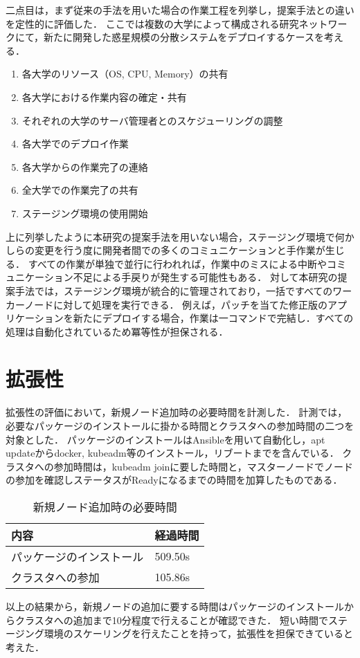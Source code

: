二点目は，まず従来の手法を用いた場合の作業工程を列挙し，提案手法との違いを定性的に評価した．
ここでは複数の大学によって構成される研究ネットワークにて，新たに開発した惑星規模の分散システムをデプロイするケースを考える．

\begin{enumerate}
  \item 各大学のリソース（OS, CPU, Memory）の共有
  \item 各大学における作業内容の確定・共有
  \item それぞれの大学のサーバ管理者とのスケジューリングの調整
  \item 各大学でのデプロイ作業
  \item 各大学からの作業完了の連絡
  \item 全大学での作業完了の共有
  \item ステージング環境の使用開始
\end{enumerate}

上に列挙したように本研究の提案手法を用いない場合，ステージング環境で何かしらの変更を行う度に開発者間での多くのコミュニケーションと手作業が生じる．
すべての作業が単独で並行に行われれば，作業中のミスによる中断やコミュニケーション不足による手戻りが発生する可能性もある．
対して本研究の提案手法では，ステージング環境が統合的に管理されており，一括ですべてのワーカーノードに対して処理を実行できる．
例えば，パッチを当てた修正版のアプリケーションを新たにデプロイする場合，作業は一コマンドで完結し．すべての処理は自動化されているため冪等性が担保される．

\section{拡張性}
\label{evaluation:method}

拡張性の評価において，新規ノード追加時の必要時間を計測した．
計測では，必要なパッケージのインストールに掛かる時間とクラスタへの参加時間の二つを対象とした．
パッケージのインストールはAnsibleを用いて自動化し，apt updateからdocker, kubeadm等のインストール，リブートまでを含んでいる．
クラスタへの参加時間は，kubeadm joinに要した時間と，マスターノードでノードの参加を確認しステータスがReadyになるまでの時間を加算したものである．

\begin{table}[htb]
  \begin{center}
    \caption{新規ノード追加時の必要時間}
    \begin{tabular}{|l|l|} \hline
      内容 & 経過時間 \\ \hline
      パッケージのインストール & 509.50s \\ \hline
      クラスタへの参加 & 105.86s \\ \hline
    \end{tabular}
  \end{center}
\end{table}

以上の結果から，新規ノードの追加に要する時間はパッケージのインストールからクラスタへの追加まで10分程度で行えることが確認できた．
短い時間でステージング環境のスケーリングを行えたことを持って，拡張性を担保できていると考えた．

